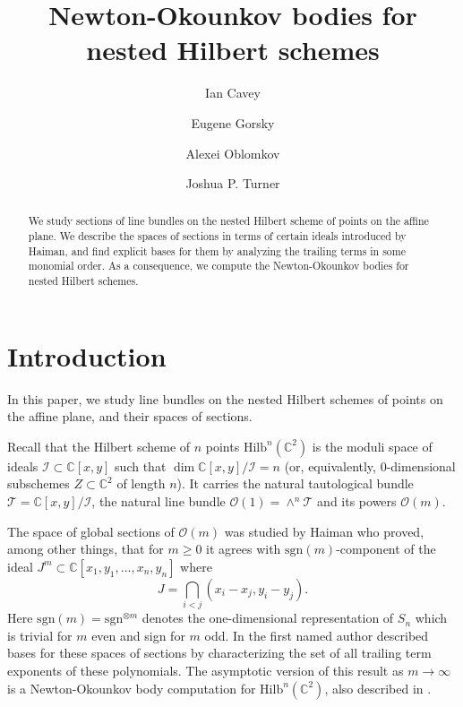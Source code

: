 \documentclass[12pt]{amsart}
\title{Newton-Okounkov bodies for nested Hilbert schemes}
\author{Ian Cavey}
\author{Eugene Gorsky}
\author{Alexei Oblomkov}
\author{Joshua P. Turner}
\newcommand{\Hilb}{\mathrm{Hilb}}
\newcommand{\C}{\mathbb{C}}
\newcommand{\CT}{\mathcal{T}}
\newcommand{\CO}{\mathcal{O}}
\newcommand{\CI}{\mathcal{I}}
\newcommand{\sgn}{\mathrm{sgn}}
\numberwithin{equation}{section}
\theoremstyle{definition}
\begin{document}
\begin{abstract}
We study sections of line bundles on the nested Hilbert scheme of points on the affine plane. We describe the spaces of sections in terms of certain ideals introduced by Haiman, and find explicit bases for them by analyzing the trailing terms in some monomial order. As a consequence, we compute the Newton-Okounkov bodies for nested Hilbert schemes.
\end{abstract}

\maketitle

\section{Introduction}

In this paper, we study line bundles on the nested Hilbert schemes of points on the affine plane, and their spaces of sections. 

Recall that the Hilbert scheme of $n$ points $\Hilb^n(\C^2)$ is the moduli space of ideals $\CI\subset \C[x,y]$ such that $\dim \C[x,y]/\CI=n$ (or, equivalently, $0$-dimensional subschemes $Z\subset \C^2$ of length $n$). It carries the natural tautological bundle $\CT=\C[x,y]/\CI$, the natural line bundle $\CO(1)=\wedge^n\CT$ and its powers $\CO(m)$. 

The space of global sections of $\CO(m)$ was studied by Haiman \cite{Haiman,Haimanqt} who proved, among other things, that for $m\ge 0$ it agrees with $\sgn(m)$-component of the ideal $J^{m}\subset \C[x_1,y_1,\ldots,x_n,y_n]$ where
\begin{equation}
\label{eq: def J intro}
J = \bigcap_{i<j} (x_i-x_j,y_i-y_j).
\end{equation}
Here $\sgn(m)=\sgn^{\otimes m}$ denotes the one-dimensional representation of $S_n$ which is trivial for $m$ even and sign for $m$ odd.
In \cite{C} the first named author described bases for these spaces of sections by characterizing the set of all trailing term exponents of these polynomials. The asymptotic version of this result as $m\to\infty$ is a Newton-Okounkov body computation for $\Hilb^n(\C^2)$, also described in \cite{C}.
\end{document}

